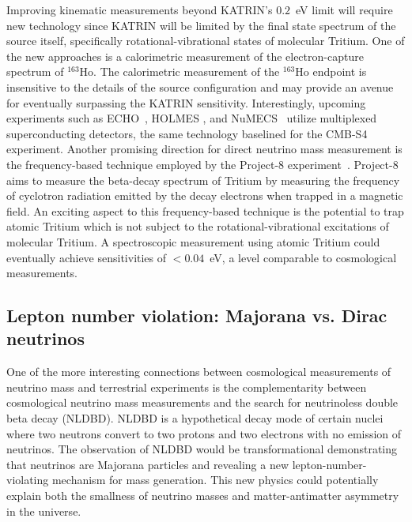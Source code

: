 Improving kinematic measurements beyond KATRIN's $0.2$~eV limit will require new technology since KATRIN will be limited by the final state spectrum of the source itself, specifically rotational-vibrational states of molecular Tritium. One of the new approaches is a calorimetric measurement of the electron-capture spectrum of $^{163}$Ho. The calorimetric measurement of the $^{163}$Ho endpoint is insensitive to the details of the source configuration and may provide an avenue for eventually surpassing the KATRIN sensitivity. Interestingly, upcoming experiments such as ECHO~\cite{Eliseev:2015pda}, HOLMES \cite{Ceriale:2015mtn}, and NuMECS~\cite{Croce:2015kwa} utilize multiplexed superconducting detectors, the same technology baselined for the CMB-S4 experiment. Another promising direction for direct neutrino mass measurement is the frequency-based technique employed by the Project-8 experiment~\cite{Asner:2014cwa}. Project-8 aims to measure the beta-decay spectrum of Tritium by measuring the frequency of cyclotron radiation emitted by the decay electrons when trapped in a magnetic field. An exciting aspect to this frequency-based technique is the potential to trap atomic Tritium which is not subject to the rotational-vibrational excitations of molecular Tritium. A spectroscopic measurement using atomic Tritium could eventually achieve sensitivities of $<0.04$~eV, a level comparable to cosmological measurements.


\subsection{Lepton number violation: Majorana vs. Dirac neutrinos}
One of the more interesting connections between cosmological measurements of neutrino mass and terrestrial experiments is the complementarity between cosmological neutrino mass measurements and the search for neutrinoless double beta decay (NLDBD). NLDBD is a hypothetical decay mode of certain nuclei where two neutrons convert to two protons and two electrons with no emission of neutrinos. The observation of NLDBD would be transformational demonstrating that neutrinos are Majorana particles and revealing a new lepton-number-violating mechanism for mass generation. This new physics could potentially explain both the smallness of neutrino masses and matter-antimatter asymmetry in the universe.

